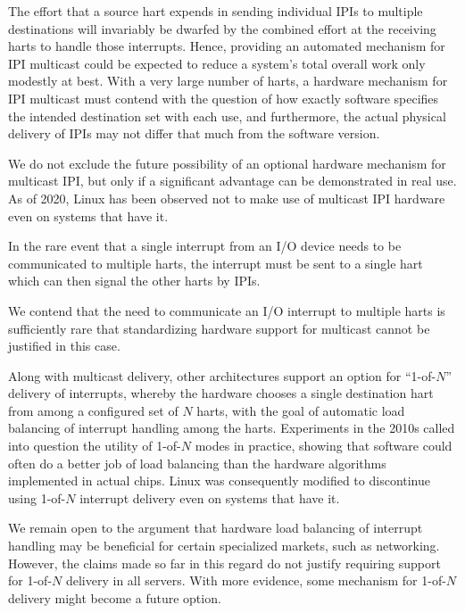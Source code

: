 \begin{commentary}
The effort that a source hart expends in sending individual IPIs to
multiple destinations will invariably be dwarfed by the combined effort
at the receiving harts to handle those interrupts.
Hence, providing an automated mechanism for IPI multicast could be
expected to reduce a system's total overall work only modestly at best.
With a very large number of harts, a hardware mechanism for IPI
multicast must contend with the question of how exactly software
specifies the intended destination set with each use, and furthermore,
the actual physical delivery of IPIs may not differ that much from the
software version.

We do not exclude the future possibility of an optional hardware
mechanism for multicast IPI, but only if a significant advantage can be
demonstrated in real use.
As of 2020, Linux has been observed not to make use of multicast IPI
hardware even on systems that have it.
\end{commentary}

In the rare event that a single interrupt from an I/O device needs
to be communicated to multiple harts, the interrupt must be sent to a
single hart which can then signal the other harts by IPIs.

\begin{commentary}
We contend that the need to communicate an I/O interrupt to multiple
harts is sufficiently rare that standardizing hardware support for multicast
cannot be justified in this case.
\end{commentary}

\begin{commentary}
Along with multicast delivery, other architectures support an option
for ``\mbox{1-of-$N$}'' delivery of interrupts, whereby the hardware
chooses a single destination hart from among a configured set of
$N$ harts, with the goal of automatic load balancing of interrupt
handling among the harts.
Experiments in the 2010s called into question the utility of
\mbox{1-of-$N$} modes in practice, showing that software could often do
a better job of load balancing than the hardware algorithms implemented
in actual chips.
Linux was consequently modified to discontinue using \mbox{1-of-$N$}
interrupt delivery even on systems that have it.

We remain open to the argument that hardware load balancing of
interrupt handling may be beneficial for certain specialized markets,
such as networking.
However, the claims made so far in this regard do not justify requiring
support for \mbox{1-of-$N$} delivery in all {\RISCV} servers.
With more evidence, some mechanism for \mbox{1-of-$N$} delivery might
become a future option.
\end{commentary}

